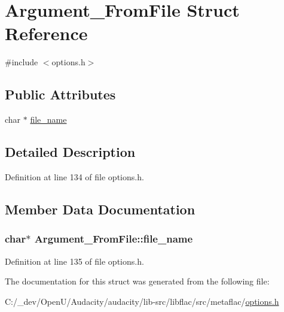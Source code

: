 \hypertarget{struct_argument___from_file}{}\section{Argument\+\_\+\+From\+File Struct Reference}
\label{struct_argument___from_file}


{\ttfamily \#include $<$options.\+h$>$}

\subsection*{Public Attributes}
\begin{DoxyCompactItemize}
\item 
char $\ast$ \hyperlink{struct_argument___from_file_a7a84a0728b8b5b67c272d78620515fda}{file\+\_\+name}
\end{DoxyCompactItemize}


\subsection{Detailed Description}


Definition at line 134 of file options.\+h.



\subsection{Member Data Documentation}
\subsubsection[{\texorpdfstring{file\+\_\+name}{file_name}}]{\setlength{\rightskip}{0pt plus 5cm}char$\ast$ Argument\+\_\+\+From\+File\+::file\+\_\+name}\hypertarget{struct_argument___from_file_a7a84a0728b8b5b67c272d78620515fda}{}\label{struct_argument___from_file_a7a84a0728b8b5b67c272d78620515fda}


Definition at line 135 of file options.\+h.



The documentation for this struct was generated from the following file\+:\begin{DoxyCompactItemize}
\item 
C\+:/\+\_\+dev/\+Open\+U/\+Audacity/audacity/lib-\/src/libflac/src/metaflac/\hyperlink{libflac_2src_2metaflac_2options_8h}{options.\+h}\end{DoxyCompactItemize}
